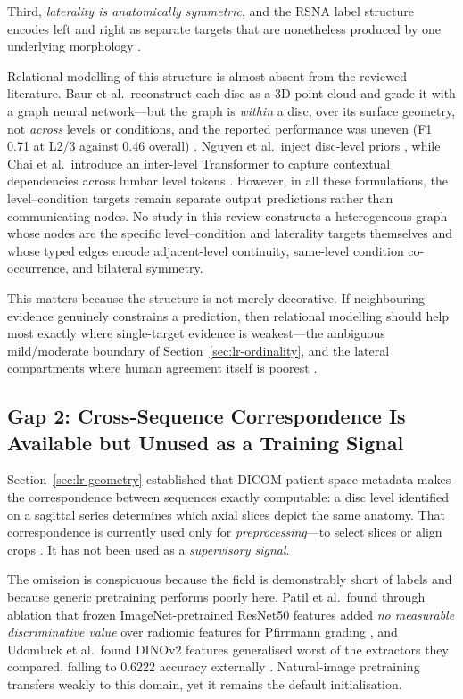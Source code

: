 Third, \emph{laterality is anatomically symmetric}, and the RSNA label structure
encodes left and right as separate targets that are nonetheless produced by one
underlying morphology \cite{richards2026the}.

Relational modelling of this structure is almost absent from the reviewed
literature. Baur et al.\ reconstruct each disc as a 3D point cloud and grade it
with a graph neural network---but the graph is \emph{within} a disc, over its
surface geometry, not \emph{across} levels or conditions, and the reported
performance was uneven (F1 0.71 at L2/3 against 0.46 overall)
\cite{baur2024automated}. Nguyen et al.\ inject disc-level priors
\cite{nguyen2026crossspine}, while Chai et al.\ introduce an inter-level
Transformer to capture contextual dependencies across lumbar level tokens
\cite{chai2026anatomy}. However, in all these formulations, the level--condition
targets remain separate output predictions rather than communicating nodes. No study
in this review constructs a heterogeneous graph whose nodes are the specific
level--condition and laterality targets themselves and whose typed edges encode
adjacent-level continuity, same-level condition co-occurrence, and bilateral symmetry.

This matters because the structure is not merely decorative. If neighbouring
evidence genuinely constrains a prediction, then relational modelling should
help most exactly where single-target evidence is weakest---the ambiguous
mild/moderate boundary of Section~\ref{sec:lr-ordinality}, and the lateral
compartments where human agreement itself is poorest
\cite{lurie2008reliability}.

\subsection{Gap 2: Cross-Sequence Correspondence Is Available but Unused as a Training Signal}
\label{sec:lr-gap-ssl}

Section~\ref{sec:lr-geometry} established that DICOM patient-space metadata makes
the correspondence between sequences exactly computable: a disc level identified
on a sagittal series determines which axial slices depict the same anatomy. That
correspondence is currently used only for \emph{preprocessing}---to select slices
or align crops \cite{pan2021automatically,batra2025mscan}. It has not been used
as a \emph{supervisory signal}.

The omission is conspicuous because the field is demonstrably short of labels and
because generic pretraining performs poorly here. Patil et al.\ found through
ablation that frozen ImageNet-pretrained ResNet50 features added \emph{no
measurable discriminative value} over radiomic features for Pfirrmann grading
\cite{patil2026mribased}, and Udomluck et al.\ found DINOv2 features generalised
worst of the extractors they compared, falling to 0.6222 accuracy externally
\cite{udomluck2026multitask}. Natural-image pretraining transfers weakly to this
domain, yet it remains the default initialisation.

